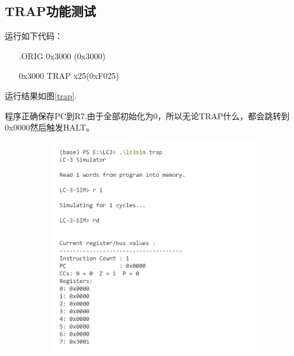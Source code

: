 \documentclass[UTF8]{ctexart}
\begin{document}
\subsection{TRAP功能测试}
运行如下代码：
\begin{enumerate}
    \item[ ] .ORIG 0x3000 (0x3000)
    \item[0x3000] TRAP x25(0xF025)
\end{enumerate}
运行结果如图\ref{trap}.

程序正确保存PC到R7.由于全部初始化为0，所以无论TRAP什么，都会跳转到0x0000然后触发HALT。
\begin{figure}[htbp]
  \centering
  \begin{subfigure}{0.48\textwidth} %
    \includegraphics[width=\linewidth]{trap1.png}
  \end{subfigure}
  \hfill
  \begin{subfigure}{0.48\textwidth}

\end{subfigure}
\end{figure}
\end{document}
